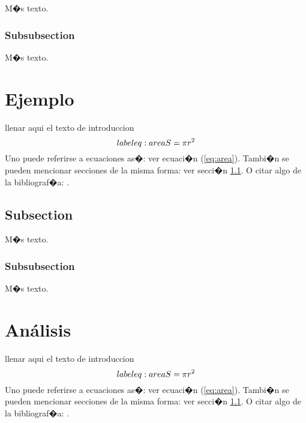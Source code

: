 \documentclass{article}
\theoremstyle{definition}
\theoremstyle{remark}
\begin{document}
M�s texto.

\subsubsection{Subsubsection}\label{sec:nada2}

M�s texto.





\section{Ejemplo}

llenar aqui el texto de introduccion
\begin{equation}\\label{eq:area}
  S = \pi r^2
\end{equation}
Uno puede referirse a ecuaciones as�: ver ecuaci�n (\ref{eq:area}).
Tambi�n se pueden mencionar secciones de la misma forma: ver secci�n
\ref{sec:nada}. O citar algo de la bibliograf�a: \cite{Cd94}.

\subsection{Subsection}\label{sec:nada}

M�s texto.

\subsubsection{Subsubsection}\label{sec:nada2}

M�s texto.




\section{An\'alisis}

llenar aqui el texto de introduccion
\begin{equation}\\label{eq:area}
  S = \pi r^2
\end{equation}
Uno puede referirse a ecuaciones as�: ver ecuaci�n (\ref{eq:area}).
Tambi�n se pueden mencionar secciones de la misma forma: ver secci�n
\ref{sec:nada}. O citar algo de la bibliograf�a: \cite{Cd94}.
\end{document}
